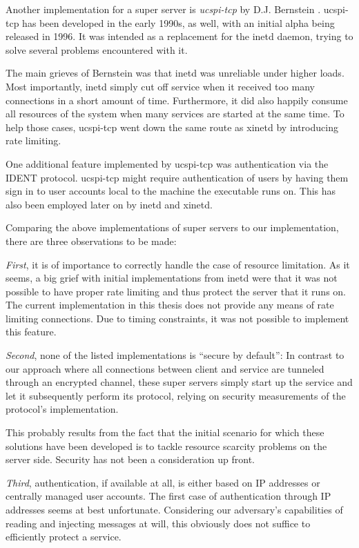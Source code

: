 Another implementation for a super server is \emph{ucspi-tcp} by D.J. Bernstein \cite{ucspi-tcp}.
ucspi-tcp has been developed in the early 1990s, as well, with an initial alpha being released in 1996.
It was intended as a replacement for the inetd daemon, trying to solve several problems encountered with it.

The main grieves of Bernstein was that inetd was unreliable under higher loads.
Most importantly, inetd simply cut off service when it received too many connections in a short amount of time.
Furthermore, it did also happily consume all resources of the system when many services are started at the same time.
To help those cases, ucspi-tcp went down the same route as xinetd by introducing rate limiting.

One additional feature implemented by ucspi-tcp was authentication via the IDENT protocol.
ucspi-tcp might require authentication of users by having them sign in to user accounts local to the machine the executable runs on.
This has also been employed later on by inetd and xinetd.

\bigskip

Comparing the above implementations of super servers to our implementation, there are three observations to be made:

\emph{First}, it is of importance to correctly handle the case of resource limitation.
As it seems, a big grief with initial implementations from inetd were that it was not possible to have proper rate limiting and thus protect the server that it runs on.
The current implementation in this thesis does not provide any means of rate limiting connections.
Due to timing constraints, it was not possible to implement this feature.

\emph{Second}, none of the listed implementations is ``secure by default'':
In contrast to our approach where all connections between client and service are tunneled through an encrypted channel, these super servers simply start up the service and let it subsequently perform its protocol, relying on security measurements of the protocol's implementation.

This probably results from the fact that the initial scenario for which these solutions have been developed is to tackle resource scarcity problems on the server side.
Security has not been a consideration up front.

\emph{Third}, authentication, if available at all, is either based on IP addresses or centrally managed user accounts.
The first case of authentication through IP addresses seems at best unfortunate.
Considering our adversary's capabilities of reading and injecting messages at will, this obviously does not suffice to efficiently protect a service.

